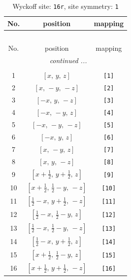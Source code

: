 \documentclass[fleqn,8pt]{jsarticle}
\begin{document}
\begin{longtable}{ccc}
\caption{Wyckoff site: {\tt 16r}, site symmetry: {\tt 1}}
 \\
 \hline \hline
No. & position & mapping \\ \hline \endfirsthead

\multicolumn{2}{l}{\tablename\ \thetable{}} \\
 \hline \hline
No. & position & mapping \\ \hline \endhead

 \hline \hline
\multicolumn{2}{r}{\footnotesize\it continued ...} \\ \endfoot

 \hline \hline
\multicolumn{2}{r}{} \\ \endlastfoot

1 & $\left[ x,\, y,\, z \right]$ & {\tt [1]} \\ \hline
2 & $\left[ x,\, - y,\, - z \right]$ & {\tt [2]} \\ \hline
3 & $\left[ - x,\, y,\, - z \right]$ & {\tt [3]} \\ \hline
4 & $\left[ - x,\, - y,\, z \right]$ & {\tt [4]} \\ \hline
5 & $\left[ - x,\, - y,\, - z \right]$ & {\tt [5]} \\ \hline
6 & $\left[ - x,\, y,\, z \right]$ & {\tt [6]} \\ \hline
7 & $\left[ x,\, - y,\, z \right]$ & {\tt [7]} \\ \hline
8 & $\left[ x,\, y,\, - z \right]$ & {\tt [8]} \\ \hline
9 & $\left[ x + \frac{1}{2},\, y + \frac{1}{2},\, z \right]$ & {\tt [9]} \\ \hline
10 & $\left[ x + \frac{1}{2},\, \frac{1}{2} - y,\, - z \right]$ & {\tt [10]} \\ \hline
11 & $\left[ \frac{1}{2} - x,\, y + \frac{1}{2},\, - z \right]$ & {\tt [11]} \\ \hline
12 & $\left[ \frac{1}{2} - x,\, \frac{1}{2} - y,\, z \right]$ & {\tt [12]} \\ \hline
13 & $\left[ \frac{1}{2} - x,\, \frac{1}{2} - y,\, - z \right]$ & {\tt [13]} \\ \hline
14 & $\left[ \frac{1}{2} - x,\, y + \frac{1}{2},\, z \right]$ & {\tt [14]} \\ \hline
15 & $\left[ x + \frac{1}{2},\, \frac{1}{2} - y,\, z \right]$ & {\tt [15]} \\ \hline
16 & $\left[ x + \frac{1}{2},\, y + \frac{1}{2},\, - z \right]$ & {\tt [16]} \\
\end{longtable}
\end{document}

